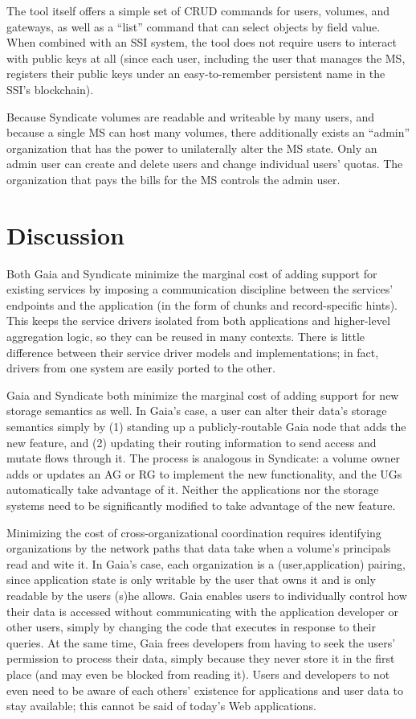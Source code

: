 The tool itself offers a simple set of CRUD commands for users, volumes, and
gateways, as well as a ``list'' command that can select objects by field value.
When combined with an SSI system, the tool does not require users to interact with
public keys at all (since each user, including the user that manages the MS,
registers their public keys under an easy-to-remember persistent name in the
SSI's blockchain).

Because Syndicate volumes are readable and writeable by many users, and because
a single MS can host many volumes, there additionally exists an ``admin''
organization that has the power to unilaterally alter the MS state.  Only an
admin user can create and delete users and change individual users' quotas.
The organization that pays the bills for the MS controls the admin user.

\section{Discussion}

Both Gaia and Syndicate minimize the marginal cost of adding support for
existing services by imposing a communication discipline between the services'
endpoints and the application (in the form of chunks and record-specific hints).
This keeps the service drivers isolated from both applications and higher-level
aggregation logic, so they can be reused in many contexts.  There is little
difference between their service driver models and implementations; in fact,
drivers from one system are easily ported to the other.

Gaia and Syndicate both minimize the marginal cost of adding support for new
storage semantics as well.  In Gaia's case, a user can alter their data's
storage semantics simply by (1) standing up a publicly-routable Gaia node that adds the new
feature, and (2) updating their routing information to send access and mutate
flows through it.  The process is analogous in
Syndicate:  a volume owner adds or updates an AG or RG to implement the new
functionality, and the UGs automatically take advantage of it.
Neither the applications nor the
storage systems need to be significantly modified to take advantage of the new
feature.

Minimizing the cost of cross-organizational coordination requires identifying
organizations by the network paths that data take when a volume's principals
read and wite it.  In Gaia's case, each organization is a (user,application) pairing, since
application state is only writable by the user that owns it and is only readable
by the users (s)he allows.  Gaia enables users to individually control how their
data is accessed without communicating with the application developer or other
users, simply by changing the code that executes in response to their queries.
At the same time, Gaia
frees developers from having to seek the users' permission to process
their data, simply because they never store it in the first place (and may even
be blocked from reading it).  Users and developers to not even need to be aware
of each others' existence for applications and user data to stay available; this
cannot be said of today's Web applications.

